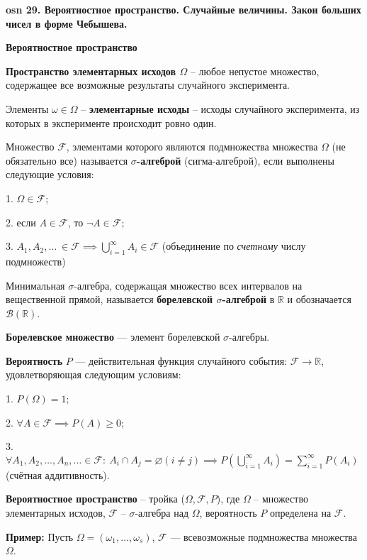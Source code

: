 \setcounter{section}{15}
\setcounter{subsection}{29}
\setcounter{equation}{0}
\textbf{\LARGE osn 29. Вероятностное пространство. Случайные величины. Закон больших чисел в форме Чебышева.}

\centerline{\textbf{Вероятностное пространство}}

\textbf{Пространство элементарных исходов $\Omega$} -- любое непустое множество, содержащее все возможные результаты случайного эксперимента.

Элементы $\omega \in \Omega$ -- \textbf{элементарные исходы} -- исходы случайного эксперимента, из которых в эксперименте происходит ровно один. 

Множество $\mathcal{F}$, элементами которого являются подмножества множества $\Omega$ (не обязательно все) называется \textbf{$\sigma$-алгеброй} (сигма-алгеброй), если выполнены следующие условия:

1. $\Omega \in \mathcal{F}$;

2. если $A \in \mathcal{F}$, то $\neg A \in \mathcal{F}$;

3. $A_1,A_2,\dots~\in \mathcal{F} \implies \bigcup_{i=1}^{\infty} A_i \in \mathcal{F}$ (объединение по \textit{счетному} числу подмножеств)


Минимальная $\sigma$-алгебра, содержащая множество всех интервалов на вещественной прямой, называется \textbf{борелевской $\sigma$-алгеброй} в $\mathbb{R}$ и обозначается $\mathcal{B}(\mathbb{R})$. 

\textbf{Борелевское множество} --- элемент борелевской $\sigma$-алгебры.

\textbf{Вероятность} $P$ --- действительная функция случайного события: $\mathcal{F} \rightarrow \mathbb{R}$, удовлетворяющая следующим условиям:

1. $P(\Omega) = 1$;

2.  $\forall A \in \mathcal{F}\implies P(A) \geqslant 0$;

3. $\forall A_1,A_2,\dots,A_n,\dots \in \mathcal{F}:~A_i \cap A_j = \varnothing (i \neq j) \implies P(\displaystyle\bigcup_{i=1}^{\infty}A_i) = \displaystyle\sum_{i=1}^{\infty}P(A_i)$ (счётная аддитивность).


\textbf{Вероятностное пространство} -- тройка ($\Omega, \mathcal{F}, P$), где $\Omega$ -- множество элементарных исходов, $\mathcal{F}$ -- $\sigma$-алгебра над $\Omega$, вероятность $P$ определена на $\mathcal{F}$.

\textbf{Пример: }
Пусть $\Omega = (\omega_1,\dots,\omega_s)$, $\mathcal{F}$ --- всевозможные подмножества множества $\Omega$.

